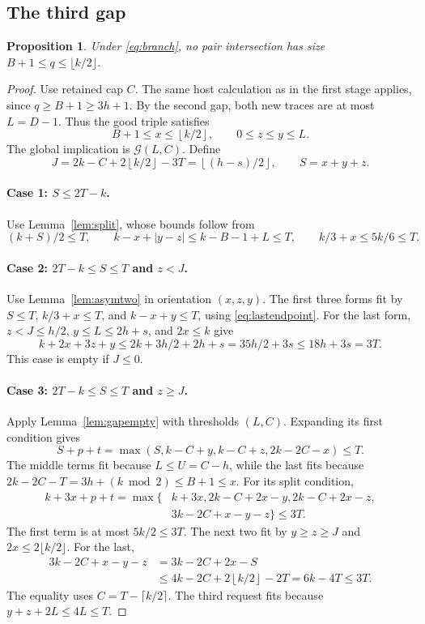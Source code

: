\documentclass[11pt]{article}
\numberwithin{equation}{section}
\newtheorem{proposition}[theorem]{Proposition}
\theoremstyle{definition}
\theoremstyle{remark}
\newcommand{\floor}[1]{\left\lfloor #1\right\rfloor}
\begin{document}
\subsection{The third gap}
\begin{proposition}\label{prop:gapthree}
Under \eqref{eq:branch}, no pair intersection has size
$B+1\le q\le\lfloor k/2\rfloor$.
\end{proposition}
\begin{proof}
Use retained cap $C$. The same host calculation as in the first stage
applies, since $q\ge B+1\ge3h+1$.
By the second gap, both new traces are at most $L=D-1$. Thus the good
triple satisfies
\[
 B+1\le x\le\floor{k/2},\qquad0\le z\le y\le L.
\]
The global implication is $\mathcal G(L,C)$. Define
\[
 J=2k-C+2\floor{k/2}-3T=\floor{(h-s)/2},\qquad S=x+y+z.
\]

\paragraph{Case 1: $S\le2T-k$.}
Use Lemma~\ref{lem:split}, whose bounds follow from
\[
 (k+S)/2\le T,\qquad k-x+|y-z|\le k-B-1+L\le T,
 \qquad k/3+x\le5k/6\le T.
\]

\paragraph{Case 2: $2T-k\le S\le T$ and $z<J$.}
Use Lemma~\ref{lem:asymtwo} in orientation $(x,z,y)$.
The first three forms fit by $S\le T$, $k/3+x\le T$, and
$k-x+y\le T$, using \eqref{eq:lastendpoint}.
For the last form, $z<J\le h/2$, $y\le L\le2h+s$, and $2x\le k$ give
\[
 k+2x+3z+y\le2k+3h/2+2h+s=35h/2+3s\le18h+3s=3T.
\]
This case is empty if $J\le0$.

\paragraph{Case 3: $2T-k\le S\le T$ and $z\ge J$.}
Apply Lemma~\ref{lem:gapempty} with thresholds $(L,C)$.
Expanding its first condition gives
\[
 S+p+t=\max(S,k-C+y,k-C+z,2k-2C-x)\le T.
\]
The middle terms fit because $L\le U=C-h$, while the last fits because
$2k-2C-T=3h+(k\bmod2)\le B+1\le x$.
For its split condition,
\[
 \begin{aligned}
 k+3x+p+t=\max\{&k+3x, 2k-C+2x-y, 2k-C+2x-z,\\
                &3k-2C+x-y-z\}\le3T.
 \end{aligned}
\]
The first term is at most $5k/2\le3T$.
The next two fit by $y\ge z\ge J$ and $2x\le2\lfloor k/2\rfloor$.
For the last,
\begin{align*}
 3k-2C+x-y-z
 &=3k-2C+2x-S\\
 &\le4k-2C+2\floor{k/2}-2T=6k-4T\le3T.
\end{align*}
The equality uses $C=T-\lceil k/2\rceil$.
The third request fits because $y+z+2L\le4L\le T$.


\end{proof}
\end{document}
